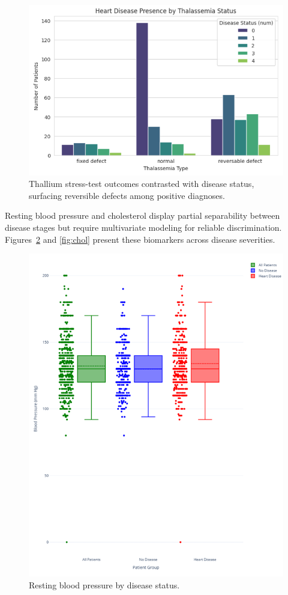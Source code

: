 \documentclass[conference]{IEEEtran}
\begin{document}
\begin{figure}[t]
  \centering
  \includegraphics[width=0.85\linewidth]{thallium_test_results_vs_disease_status.png}
  \caption{Thallium stress-test outcomes contrasted with disease status, surfacing reversible defects among positive diagnoses.}
  \label{fig:thal_results}
\end{figure}

Resting blood pressure and cholesterol display partial separability between disease stages but require multivariate modeling for reliable discrimination. Figures~\ref{fig:bp} and \ref{fig:chol} present these biomarkers across disease severities.

\begin{figure}[t]
  \centering
  \includegraphics[width=0.85\linewidth]{resting_blood_pressure_by_disease_status.png}
  \caption{Resting blood pressure by disease status.}
  \label{fig:bp}
\end{figure}
\end{document}
